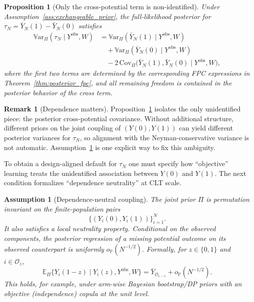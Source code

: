 \documentclass[aos]{imsart}
\newtheorem{proposition}{Proposition}
\newtheorem{assumption}{Assumption}
\theoremstyle{definition}
\newtheorem{remark}{Remark}
\theoremstyle{plain}
\newcommand{\E}{\mathbb{E}}
\newcommand{\Var}{\mathbb{V}\mathrm{ar}}
\begin{document}
\begin{proposition}[Only the cross-potential term is non-identified]\label{prop:only_cross_term}
Under Assumption~\ref{ass:exchangeable_prior}, the full-likelihood posterior for
$\tau_N=\bar Y_N(1)-\bar Y_N(0)$ satisfies
\[
\begin{aligned}
\Var_{\Pi}(\tau_N\mid Y^{\mathrm{obs}},W)
&=
\Var_{\Pi}(\bar Y_N(1)\mid Y^{\mathrm{obs}},W) \\
&\quad
+ \Var_{\Pi}(\bar Y_N(0)\mid Y^{\mathrm{obs}},W) \\
&\quad
-2\,\mathrm{Cov}_{\Pi}\!\bigl(\bar Y_N(1),\bar Y_N(0)\mid Y^{\mathrm{obs}},W\bigr),
\end{aligned}
\]
where the first two terms are determined by the corresponding FPC expressions in
Theorem~\ref{thm:posterior_fpc}, and all remaining freedom is contained in the posterior
behavior of the cross term.
\end{proposition}

\begin{remark}[Dependence matters]\label{rem:dependence_matters}
Proposition~\ref{prop:only_cross_term} isolates the only unidentified piece: the posterior
cross-potential covariance. Without additional structure, different priors on the joint
coupling of $(Y(0),Y(1))$ can yield different posterior variances for $\tau_N$, so alignment
with the Neyman-conservative variance is not automatic. Assumption~\ref{ass:neutral_coupling}
is one explicit way to fix this ambiguity.
\end{remark}

To obtain a design-aligned default for $\tau_N$ one must specify how ``objective''
learning treats the unidentified association between $Y(0)$ and $Y(1)$.
The next condition formalizes ``dependence neutrality'' at CLT scale.

\begin{assumption}[Dependence-neutral coupling]\label{ass:neutral_coupling}
The joint prior $\Pi$ is permutation invariant on the finite-population pairs
\[
\{(Y_i(0),Y_i(1))\}_{i=1}^N.
\]
It also satisfies a local neutrality property. Conditional on the observed components, the posterior
regression of a missing potential outcome on its observed counterpart is uniformly
$o_{\mathbb P}(N^{-1/2})$. Formally, for $z\in\{0,1\}$ and $i\in\mathcal O_z$,
\[
\E_{\Pi}\!\bigl\{Y_i(1-z)\mid Y_i(z),Y^{\mathrm{obs}},W\bigr\}
=
\bar Y_{\mathcal O_{1-z}}+o_{\mathbb P}(N^{-1/2}).
\]
This holds, for example, under arm-wise Bayesian bootstrap/DP priors with an objective
(independence) copula at the unit level.
\end{assumption}
\end{document}

